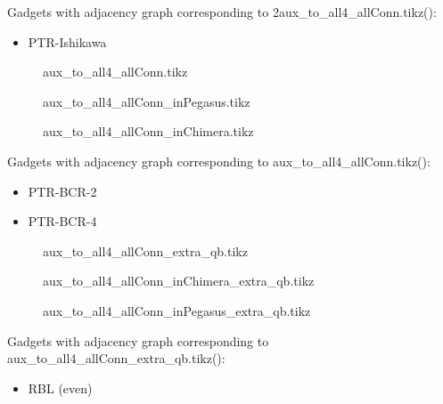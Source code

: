 \documentclass{article}
\begin{document}
Gadgets with adjacency graph corresponding to 2aux\_to\_all4\_allConn.tikz(\scalebox{.25}{}):

\begin{itemize}
\item PTR-Ishikawa
\end{itemize}

\begin{figure}

\caption{aux\_to\_all4\_allConn.tikz}
\end{figure}

\begin{figure}

\caption{aux\_to\_all4\_allConn\_inPegasus.tikz}
\end{figure}

\begin{figure}

\caption{aux\_to\_all4\_allConn\_inChimera.tikz}
\end{figure}

Gadgets with adjacency graph corresponding to aux\_to\_all4\_allConn.tikz(\scalebox{.25}{}):

\begin{itemize}
\item PTR-BCR-2
\item PTR-BCR-4
\end{itemize}

\begin{figure}

\caption{aux\_to\_all4\_allConn\_extra\_qb.tikz}
\end{figure}


\begin{figure}

\caption{aux\_to\_all4\_allConn\_inChimera\_extra\_qb.tikz}
\end{figure}

\begin{figure}

\caption{aux\_to\_all4\_allConn\_inPegasus\_extra\_qb.tikz}
\end{figure}



Gadgets with adjacency graph corresponding to aux\_to\_all4\_allConn\_extra\_qb.tikz(\scalebox{.25}{}):

\begin{itemize}
\item RBL (even)
\end{itemize}
\end{document}
